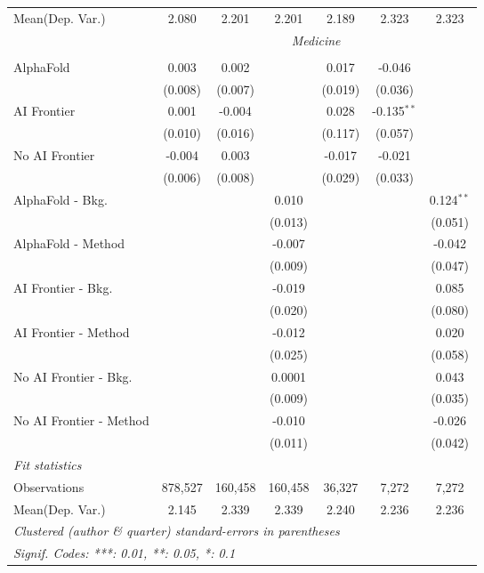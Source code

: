 \begin{tabular}{lcccccc}
Mean(Dep. Var.) & 2.080 & 2.201 & 2.201 & 2.189 & 2.323 & 2.323 \\
 & \multicolumn{6}{c}{\textit{Medicine}} \\ \\
   AlphaFold               & 0.003   & 0.002   &         & 0.017   & -0.046        &   \\   
                           & (0.008) & (0.007) &         & (0.019) & (0.036)       &   \\   
   AI Frontier             & 0.001   & -0.004  &         & 0.028   & -0.135$^{**}$ &   \\   
                           & (0.010) & (0.016) &         & (0.117) & (0.057)       &   \\   
   No AI Frontier          & -0.004  & 0.003   &         & -0.017  & -0.021        &   \\   
                           & (0.006) & (0.008) &         & (0.029) & (0.033)       &   \\   
   AlphaFold - Bkg.        &         &         & 0.010   &         &               & 0.124$^{**}$\\   
                           &         &         & (0.013) &         &               & (0.051)\\   
   AlphaFold - Method      &         &         & -0.007  &         &               & -0.042\\   
                           &         &         & (0.009) &         &               & (0.047)\\   
   AI Frontier - Bkg.      &         &         & -0.019  &         &               & 0.085\\   
                           &         &         & (0.020) &         &               & (0.080)\\   
   AI Frontier - Method    &         &         & -0.012  &         &               & 0.020\\   
                           &         &         & (0.025) &         &               & (0.058)\\   
   No AI Frontier - Bkg.   &         &         & 0.0001  &         &               & 0.043\\   
                           &         &         & (0.009) &         &               & (0.035)\\   
   No AI Frontier - Method &         &         & -0.010  &         &               & -0.026\\   
                           &         &         & (0.011) &         &               & (0.042)\\   
   \midrule
   \emph{Fit statistics}\\
   Observations            & 878,527 & 160,458 & 160,458 & 36,327  & 7,272         & 7,272\\  
Mean(Dep. Var.) & 2.145 & 2.339 & 2.339 & 2.240 & 2.236 & 2.236 \\
   \midrule \midrule
   \multicolumn{7}{l}{\emph{Clustered (author \& quarter) standard-errors in parentheses}}\\
   \multicolumn{7}{l}{\emph{Signif. Codes: ***: 0.01, **: 0.05, *: 0.1}}\\
\end{tabular}
\par\endgroup
